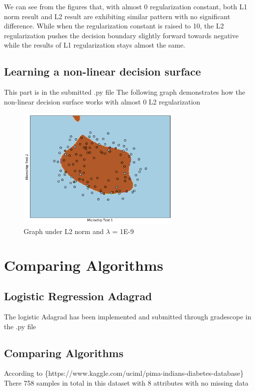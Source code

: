 \documentclass{article}
\begin{document}
	We can see from the figures that, with almost 0 regularization constant, both L1 norm result and L2 result are exhibiting similar pattern with no significant difference. While when the regularization constant is raised to 10, the L2 regularization pushes the decision boundary slightly forward towards negative while the results of L1 regularization stays almost the same.
	
	\subsection{Learning a non-linear decision surface}
	This part is in the submitted .py file
	The following graph demonstrates how the non-linear decision surface works with almost 0 L2 regularization
	\begin{figure}[H]
			\caption{Graph under L2 norm and $\lambda$ = 1E-9}
			\centering
			\includegraphics[width=8cm]{NonlinearL2norm0.png}
		\end{figure}
	\section{Comparing Algorithms}
		\subsection{Logistic Regression Adagrad}
		The logistic Adagrad has been implemented and submitted through gradescope in the .py file
		\subsection{Comparing Algorithms}
		According to \{https://www.kaggle.com/uciml/pima-indians-diabetes-database\}
		\\There 758 samples in total in this dataset with 8 attributes with no missing data\\
		
\end{document}
